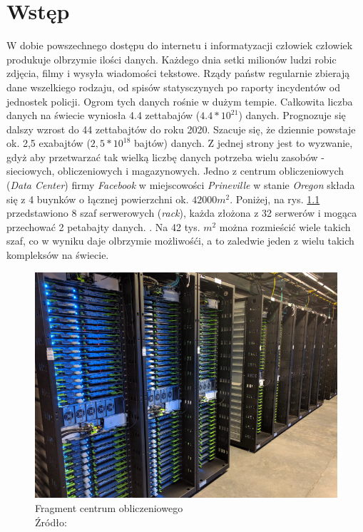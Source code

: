 \chapter{Wstęp}
W dobie powszechnego dostępu do internetu i informatyzacji człowiek człowiek produkuje olbrzymie ilości danych.
Każdego dnia setki milionów ludzi robic zdjęcia, filmy i wysyła wiadomości tekstowe.
Rządy państw regularnie zbierają dane wszelkiego rodzaju, od spisów statysczynych po raporty incydentów od jednostek policji.
Ogrom tych danych rośnie w dużym tempie.
Całkowita liczba danych na świecie wyniosła 4.4 zettabajów ($4.4 * 10^{21}$) danych.
Prognozuje się dalszy wzrost do 44 zettabajtów do roku 2020.
Szacuje się, że dziennie powstaje ok. 2,5 exabajtów ($2,5 * 10^{18}$ bajtów) danych. \cite{khoso2016}
Z jednej strony jest to wyzwanie, gdyż aby przetwarzać tak wielką liczbę danych potrzeba wielu zasobów - sieciowych, obliczeniowych i magazynowych.
Jedno z centrum obliczeniowych (\textit{Data Center}) firmy \textit{Facebook} w miejscowości \textit{Prineville} w stanie \textit{Oregon} składa się z 4 buynków o łącznej powierzchni ok. $42000 m^2$.
Poniżej, na rys. \ref{fig:data_center} przedstawiono 8 szaf serwerowych (\textit{rack}), każda złożona z 32 serwerów i mogąca przechować 2 petabajty danych. \cite{lardinois2016}.
Na 42 tys. $m^2$ można rozmieścić wiele takich szaf, co w wyniku daje olbrzymie możliwośći, a to zaledwie jeden z wielu takich kompleksów na świecie.

\begin{figure}[h!tb]
	 \centering
	 \includegraphics[width = 1.0\linewidth]{img/data_center}
	 \caption{Fragment centrum obliczeniowego \\
              Źródło: \cite{lardinois2016}}
	 \label{fig:data_center}
\end{figure}


